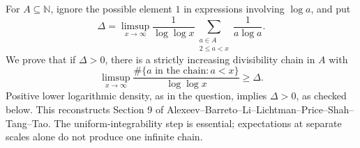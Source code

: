 For $A\subseteq\mathbb N$, ignore the possible element $1$ in expressions involving $\log a$, and put
\[
 \Delta=\limsup_{x\to\infty}\frac1{\log\log x}
              \sum_{\substack{a\in A\\2\le a<x}}\frac1{a\log a}.
\]
We prove that if $\Delta>0$, there is a strictly increasing divisibility chain in $A$ with
\[
 \limsup_{x\to\infty}\frac{\#\{a\text{ in the chain}:a<x\}}{\log\log x}\ge\Delta.
 \tag{1}
\]
Positive lower logarithmic density, as in the question, implies $\Delta>0$, as checked below. This reconstructs Section 9 of Alexeev--Barreto--Li--Lichtman--Price--Shah--Tang--Tao. The uniform-integrability step is essential; expectations at separate scales alone do not produce one infinite chain.
